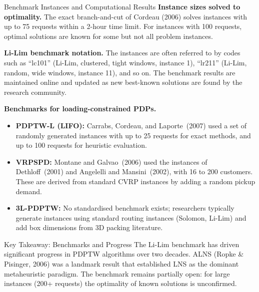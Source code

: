 \documentclass[aspectratio=169,10pt]{beamer}
\begin{document}
\begin{frame}[allowframebreaks]{Benchmark Instances and Computational Results}
  \textbf{Instance sizes solved to optimality.} The exact branch-and-cut of Cordeau (2006)
  solves instances with up to 75 requests within a 2-hour time limit. For instances with
  100 requests, optimal solutions are known for some but not all problem instances.

  \textbf{Li-Lim benchmark notation.} The instances are often referred to by codes such as
  ``lc101'' (Li-Lim, clustered, tight windows, instance 1), ``lr211'' (Li-Lim, random,
  wide windows, instance 11), and so on. The benchmark results are maintained online
  and updated as new best-known solutions are found by the research community.

  \framebreak

  \textbf{Benchmarks for loading-constrained PDPs.}
  \begin{itemize}
    \item \textbf{PDPTW-L (LIFO):} Carrabs, Cordeau, and Laporte~(2007) used a set of
          randomly generated instances with up to 25 requests for exact methods, and up to
          100 requests for heuristic evaluation.
    \item \textbf{VRPSPD:} Montane and Galvao~(2006) used the instances of Dethloff~(2001)
          and Angelelli and Mansini~(2002), with 16 to 200 customers. These are derived
          from standard CVRP instances by adding a random pickup demand.
    \item \textbf{3L-PDPTW:} No standardised benchmark exists; researchers typically
          generate instances using standard routing instances (Solomon, Li-Lim) and add
          box dimensions from 3D packing literature.
  \end{itemize}

  \begin{alertblock}{Key Takeaway: Benchmarks and Progress}
    The Li-Lim benchmark has driven significant progress in PDPTW algorithms over two
    decades. ALNS (Ropke \& Pisinger, 2006) was a landmark result that established LNS
    as the dominant metaheuristic paradigm. The benchmark remains partially open: for
    large instances (200+ requests) the optimality of known solutions is unconfirmed.
  \end{alertblock}

\end{frame}
\end{document}
